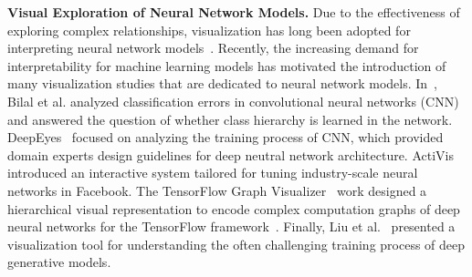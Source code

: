 \textbf{Visual Exploration of Neural Network Models.}
Due to the effectiveness of exploring complex relationships, visualization has long been adopted for interpreting neural network models~\cite{TzengMa2005}.
Recently, the increasing demand for interpretability for machine learning models has motivated the introduction of many visualization studies that are dedicated to neural network models.
%
In~\cite{BilalJourablooYe2018}, Bilal et al. analyzed classification errors in convolutional neural networks (CNN) and answered the question of whether class hierarchy is learned in the network.
%
DeepEyes~\cite{Pezzotti2018} focused on analyzing the training process of CNN, which provided domain experts design guidelines for deep neutral network architecture.
%
ActiVis~\cite{KahngAndrewsKalro2018} introduced an interactive system tailored for tuning industry-scale neural networks in Facebook.
The TensorFlow Graph Visualizer~\cite{Wongsuphasawat2018} work designed a hierarchical visual representation to encode complex computation graphs of deep neural networks for the TensorFlow framework~\cite{Abadi2016}.
Finally, Liu et al.~\cite{LiuShiCao2018} presented a visualization tool for understanding the often challenging training process of deep generative models.


